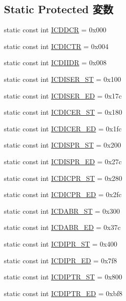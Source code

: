 \subsection*{Static Protected 変数}
\begin{DoxyCompactItemize}
\item 
static const int \hyperlink{classPl390_a0438fcd6c355e9ee0f4dfbb52a8df185}{ICDDCR} = 0x000
\item 
static const int \hyperlink{classPl390_a0c58ee924126812674213e9fbb97956f}{ICDICTR} = 0x004
\item 
static const int \hyperlink{classPl390_a3eb18d588046d1093762d2dd79f6b563}{ICDIIDR} = 0x008
\item 
static const int \hyperlink{classPl390_a967e1ae96980f25524ea435853fe54d1}{ICDISER\_\-ST} = 0x100
\item 
static const int \hyperlink{classPl390_a0f76976aa74415dcd9aec96a1f70758a}{ICDISER\_\-ED} = 0x17c
\item 
static const int \hyperlink{classPl390_a56ca3d402724ba490eed116c059f4bf1}{ICDICER\_\-ST} = 0x180
\item 
static const int \hyperlink{classPl390_adaa1179ddc7a651be29f72be0e19c4d4}{ICDICER\_\-ED} = 0x1fc
\item 
static const int \hyperlink{classPl390_aeafca9a9f217ac149ec11d59cf25da9a}{ICDISPR\_\-ST} = 0x200
\item 
static const int \hyperlink{classPl390_a5f1357dca4f87c003ecd67e6ce2a6840}{ICDISPR\_\-ED} = 0x27c
\item 
static const int \hyperlink{classPl390_af8249cc4f3e77d812877de9557be0cd0}{ICDICPR\_\-ST} = 0x280
\item 
static const int \hyperlink{classPl390_a98f072638834510ed1fe555392dbdd30}{ICDICPR\_\-ED} = 0x2fc
\item 
static const int \hyperlink{classPl390_ada9ed9528249cdb6ce90174e180c6e83}{ICDABR\_\-ST} = 0x300
\item 
static const int \hyperlink{classPl390_a90ba1a5529bf96f4dbd87ac105fa4a22}{ICDABR\_\-ED} = 0x37c
\item 
static const int \hyperlink{classPl390_a1483278b83c758d54081d9e4646da369}{ICDIPR\_\-ST} = 0x400
\item 
static const int \hyperlink{classPl390_a28b5a0626045b2093fec240d94ce73ff}{ICDIPR\_\-ED} = 0x7f8
\item 
static const int \hyperlink{classPl390_ac442d8d76d06e1e3a49c415c328664c2}{ICDIPTR\_\-ST} = 0x800
\item 
static const int \hyperlink{classPl390_a083710529636f2bd1b38a28ea3afbbfd}{ICDIPTR\_\-ED} = 0xbf8

\end{DoxyCompactItemize}
